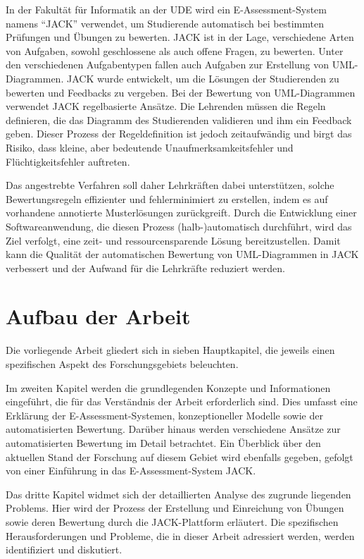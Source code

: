In der Fakultät für Informatik an der \ac{UDE} wird ein E-Assessment-System namens ``\gls{JACK}'' \cite{jack}  verwendet, um Studierende automatisch bei bestimmten Prüfungen und Übungen zu bewerten. \gls{JACK} ist in der Lage, verschiedene Arten von Aufgaben, sowohl geschlossene als auch offene Fragen, zu bewerten. Unter den verschiedenen Aufgabentypen fallen auch Aufgaben zur Erstellung von \ac{UML}-Diagrammen. \gls{JACK} wurde entwickelt, um die Lösungen der Studierenden zu bewerten und Feedbacks zu vergeben. Bei der Bewertung von \ac{UML}-Diagrammen verwendet \gls{JACK} regelbasierte Ansätze. Die Lehrenden müssen die Regeln definieren, die das Diagramm des Studierenden validieren und ihm ein Feedback geben. Dieser Prozess der Regeldefinition ist jedoch zeitaufwändig und birgt das Risiko, dass kleine, aber bedeutende Unaufmerksamkeitsfehler und Flüchtigkeitsfehler auftreten.

Das angestrebte Verfahren soll daher Lehrkräften dabei unterstützen, solche Bewertungsregeln effizienter und fehlerminimiert zu erstellen, indem es auf vorhandene annotierte Musterlösungen zurückgreift. Durch die Entwicklung einer Softwareanwendung, die diesen Prozess (halb-)automatisch durchführt, wird das Ziel verfolgt, eine zeit- und ressourcensparende Lösung bereitzustellen. Damit kann die Qualität der automatischen Bewertung von UML-Diagrammen in \gls{JACK} verbessert und der Aufwand für die Lehrkräfte reduziert werden.

\section{Aufbau der Arbeit}

Die vorliegende Arbeit gliedert sich in sieben Hauptkapitel, die jeweils einen spezifischen Aspekt des Forschungsgebiets beleuchten.

Im zweiten Kapitel werden die grundlegenden Konzepte und Informationen eingeführt, die für das Verständnis der Arbeit erforderlich sind. Dies umfasst eine Erklärung der \gls{E-Assessment-Systemen}, konzeptioneller Modelle sowie der automatisierten Bewertung. Darüber hinaus werden verschiedene Ansätze zur automatisierten Bewertung im Detail betrachtet. Ein Überblick über den aktuellen Stand der Forschung auf diesem Gebiet wird ebenfalls gegeben, gefolgt von einer Einführung in das E-Assessment-System \gls{JACK}.

Das dritte Kapitel widmet sich der detaillierten Analyse des zugrunde liegenden Problems. Hier wird der Prozess der Erstellung und Einreichung von Übungen sowie deren Bewertung durch die \gls{JACK}-Plattform erläutert. Die spezifischen Herausforderungen und Probleme, die in dieser Arbeit adressiert werden, werden identifiziert und diskutiert.

